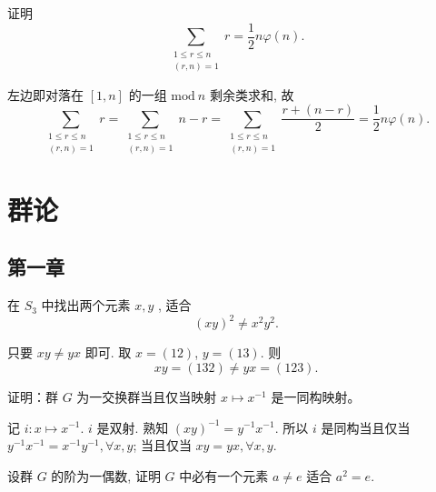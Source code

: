 \begin{problem}
    证明 
        \[
            \sum_{\substack{1\leq r\leq n\\ (r,n)=1}}^{}r=\frac{1}{2}n\varphi(n).
        \]
\end{problem}

\begin{solution}
    左边即对落在 $[1,n]$ 的一组 $\mathrm{mod}\ n$ 剩余类求和, 故
        \[
            \sum_{\substack{1\leq r\leq n\\ (r,n)=1}}^{}r=\sum_{\substack{1\leq r\leq n\\ (r,n)=1}}^{}n-r=\sum_{\substack{1\leq r\leq n\\ (r,n)=1}}^{}\frac{r+(n-r)}{2}=\frac{1}{2}n\varphi(n).
        \]
\end{solution}

\section{群论}
\subsection{第一章}

\setcounter{pb}{5}

\begin{problem}
    在  $S_3$ 中找出两个元素 $x,y$ , 适合  
    \[
        (xy)^2 \neq x^2 y^2.
    \]
\end{problem}

\begin{solution}
    只要 $x y\neq y x$ 即可. 取 $x=(1 2)$, $y=(1 3)$. 则 
        \[
            x y=(1 3 2)\ne y x = (1 2 3).
        \]
\end{solution}

\setcounter{pb}{8}

\begin{problem}
    证明：群 $G$ 为一交换群当且仅当映射 $x \mapsto x^{-1}$ 是一同构映射。
\end{problem}

\begin{solution}
    记 $i\colon x\mapsto x^{-1}$. $i$ 是双射. 熟知 $( x y)^{-1}=y ^{-1} x^{-1}$. 所以 $i$ 是同构当且仅当 $y^{-1}x^{-1}=x^{-1}y^{-1},\forall x,y$; 当且仅当 $x y=y x,\forall x,y$.
\end{solution}

\setcounter{pb}{13}

\begin{problem}
    设群 $G$ 的阶为一偶数, 证明 $G$ 中必有一个元素 $a \neq e$ 适合 $a^2 = e$.  
\end{problem}

